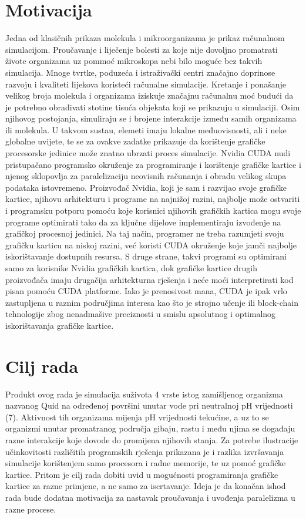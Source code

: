 \documentclass[12pt]{article}
\begin{document}
	\section{Motivacija}
	Jedna od klasičnih prikaza molekula i mikroorganizama je prikaz računalnom simulacijom. 
	Proučavanje i liječenje bolesti
za koje nije dovoljno promatrati živote organizama uz pommoć mikroskopa 
	nebi bilo moguće bez takvih simulacija.
Mnoge tvrtke, poduzeća i istraživački centri značajno
doprinose 
	razvoju i kvaliteti lijekova koristeći računalne simulacije. 
	Kretanje i ponašanje velikog broja molekula i organizama iziskuje značajnu računalnu moć budući da 
	je potrebno obrađivati stotine tisuća objekata koji
se prikazuju u simulaciji. Osim njihovog postojanja,
	simuliraju se i brojene interakcije između samih organizama ili molekula. U takvom sustau, elemeti imaju 
	lokalne međuovisnosti, ali i neke globalne uvijete, te se za ovakve zadatke prikazuje da korištenje grafičke
	procesorske jedinice može znatno ubrzati proces simulacije. Nvidia CUDA nudi pristupačano programsko okruženje 
	za programiranje i korištenje grafičke kartice i njenog sklopovlja za paralelizaciju neovisnih računanja 
	i obradu velikog skupa podataka istovremeno. Proizvođač Nvidia, koji je sam i razvijao svoje grafičke kartice, 
	njihovu arhitekturu i programe na najnižoj razini, najbolje može ostvariti i programsku potporu pomoću koje 
	korisnici njihovih grafičkih kartica mogu svoje programe optimirati tako da za ključne dijelove implementiraju
	izvođenje na grafičkoj procesnoj jedinici. Na taj način, programer ne treba razumjeti svoju grafičku karticu 
	na niskoj razini, već koristi CUDA okruženje koje jamči najbolje iskorištavanje dostupnih resursa. S druge strane,
	takvi programi su optimirani samo za korisnike Nvidia grafičkih kartica, dok grafičke kartice drugih proizvođača
	imaju drugačija arhitekturna rješenja i neće moći interpretirati kod pisan pomoću CUDA platforme. Iako je 
	prenosivost mana, CUDA je ipak vrlo zastupljena u raznim područjima interesa kao što je strojno učenje ili block-chain
	tehnologije zbog nenadmašive preciznosti u smislu apsolutnog i optimalnog iskorištavanja grafičke kartice. 
		
	
	\section{Cilj rada}
	Produkt ovog rada je simulacija suživota 4 vrste istog zamišljenog organizma nazvanog Quid na određenoj površini unutar vode 
	pri neutralnoj pH vrijednosti (7).
Aktivnost tih organizama mijenja pH vrijednosti tekućine, a uz to se organizmi 
	unutar promatranog područja gibaju, rastu i među njima se događaju razne interakcije koje dovode do promijena 
	njihovih stanja. Za potrebe ilustracije učinkovitosti različitih programskih rješenja prikazana je i razlika izvršavanja simulacije korištenjem samo procesora i radne memorije, te uz pomoć grafičke kartice.
Pritom je cilj rada dobiti uvid
	u mogućnosti programiranja grafičke kartice za razne primjene, a ne samo za iscrtavanje. Ideja je da konačan ishod rada
	bude dodatna motivacija za nastavak proučavanja i uvođenja paralelizma u razne procese. 
	
\end{document}
